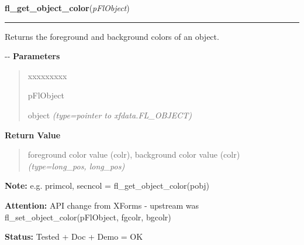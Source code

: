 \hspace{.8\funcindent}\begin{boxedminipage}{\funcwidth}

    \raggedright \textbf{fl\_get\_object\_color}(\textit{pFlObject})

    \vspace{-1.5ex}

    \rule{\textwidth}{0.5\fboxrule}
\setlength{\parskip}{2ex}

Returns the foreground and background colors of an object.

-{}-
\setlength{\parskip}{1ex}
      \textbf{Parameters}
      \vspace{-1ex}

      \begin{quote}
        \begin{Ventry}{xxxxxxxxx}

          \item[pFlObject]


object
            {\it (type=pointer to xfdata.FL\_OBJECT)}

        \end{Ventry}

      \end{quote}

      \textbf{Return Value}
    \vspace{-1ex}

      \begin{quote}

foreground color value (colr), background color value (colr)
      {\it (type=long\_pos, long\_pos)}

      \end{quote}

\textbf{Note:} 
e.g. primcol, secncol = fl\_get\_object\_color(pobj)


\textbf{Attention:} 
API change from XForms - upstream was
fl\_set\_object\_color(pFlObject, fgcolr, bgcolr)


\textbf{Status:} 
Tested + Doc + Demo = OK


    \end{boxedminipage}

    \label{xformslib:flbasic:fl_set_object_label}

    \vspace{0.5ex}

